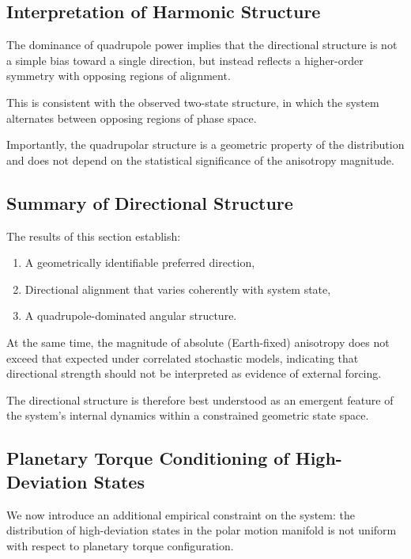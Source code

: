\documentclass[twocolumn,9pt]{revtex4-2}
\begin{document}
\subsection{Interpretation of Harmonic Structure}
\label{subsec:interpretation_of_harmonic_structure}

The dominance of quadrupole power implies that the directional structure is not a simple bias toward a single direction, but instead reflects a higher-order symmetry with opposing regions of alignment.

This is consistent with the observed two-state structure, in which the system alternates between opposing regions of phase space.

Importantly, the quadrupolar structure is a geometric property of the distribution and does not depend on the statistical significance of the anisotropy magnitude.

\subsection{Summary of Directional Structure}
\label{subsec:summary_of_directional_structure}

The results of this section establish:

\begin{enumerate}
    \item A geometrically identifiable preferred direction,
    \item Directional alignment that varies coherently with system state,
    \item A quadrupole-dominated angular structure.
\end{enumerate}

At the same time, the magnitude of absolute (Earth-fixed) anisotropy does not exceed that expected under correlated stochastic models, indicating that directional strength should not be interpreted as evidence of external forcing.

The directional structure is therefore best understood as an emergent feature of the system's internal dynamics within a constrained geometric state space.

\subsection{Planetary Torque Conditioning of High-Deviation States}

We now introduce an additional empirical constraint on the system: the distribution of
high-deviation states in the polar motion manifold is not uniform with respect to planetary
torque configuration.
\end{document}

